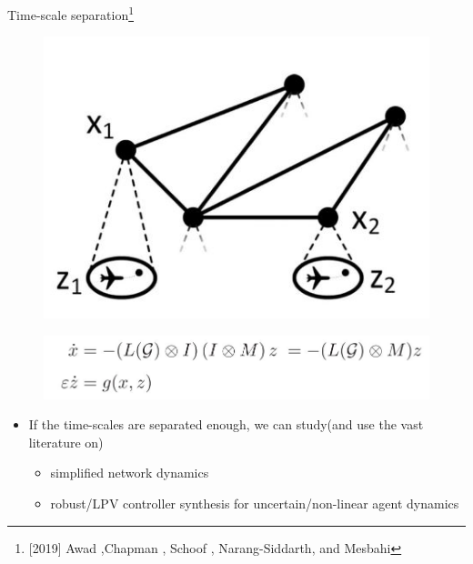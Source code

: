 \documentclass{beamer}
\begin{document}
\begin{frame}{Time-scale separation\footnote{[2019] Awad ,Chapman , Schoof , Narang-Siddarth, and Mesbahi}}
	\begin{minipage}{0.45\textwidth}
		\begin{figure}
			\includegraphics[width=0.6\linewidth]{figures/Time_scale_separation.JPG}
			\label{fig:mjlstraj}
		\end{figure}
	\end{minipage}
	\begin{minipage}{0.45\textwidth}
		\begin{figure}
			\includegraphics[width=1.35\linewidth]{figures/Time_scale_sep_dyn_sys.JPG}
			\label{fig:mjlstraj}
		\end{figure}
	\end{minipage}	
	\begin{itemize}
		\item If the time-scales are separated enough, we can study(and use the vast literature on) 
		\begin{itemize}
			\item simplified network dynamics
			\item robust/LPV controller synthesis for uncertain/non-linear agent dynamics
		\end{itemize}
	\end{itemize}
\end{frame}
\end{document}

